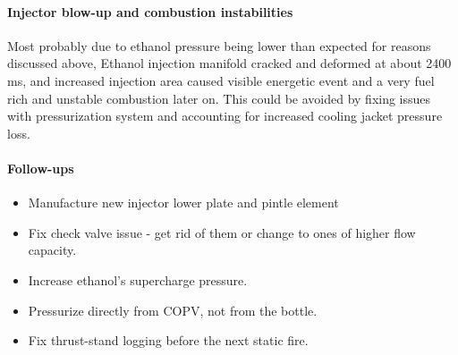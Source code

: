 \paragraph{Injector blow-up and combustion instabilities}
Most probably due to ethanol pressure being lower than expected for reasons discussed above, Ethanol injection manifold 
cracked and deformed at about 2400\,ms, and increased injection area caused visible energetic event and a 
very fuel rich and unstable combustion later on. This could be avoided by fixing issues with pressurization system and accounting for
increased cooling jacket pressure loss.

\paragraph{Follow-ups}
\begin{itemize}
  \item Manufacture new injector lower plate and pintle element
  \item Fix check valve issue - get rid of them or change to ones of higher flow capacity.
  \item Increase ethanol's supercharge pressure.
  \item Pressurize directly from COPV, not from the bottle.
  \item Fix thrust-stand logging before the next static fire.
\end{itemize}
